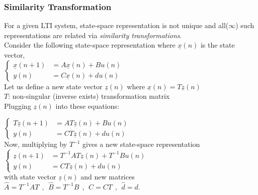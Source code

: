 \documentclass[mathserif, 10pt]{beamer} %
\def\x{\underline{x}}
\def\z{\underline{z}}
\begin{document}
\frame
{

\normalsize
\renewcommand{\theenumi}{\alph{enumi}}
\frametitle{Similarity Transformation}
For a given LTI system, state-space representation is not unique and all($\infty$) such representations are related via \textit{similarity transformations}. \\
Consider the following state-space representation where $\x(n)$ is the state vector, \\ \vspace{.05in}
 $\left\{
\begin{array}{rl}
	\x(n+1) &=A\x(n)+Bu(n)\\
	y(n)&=C\x(n)+du(n)
\end{array} \right.$
\\Let us define a new state vector $\z(n)$ where $\x(n) = T\z(n)$\\
$T$:  non-singular (inverse exists) transformation matrix\\
Plugging $\z(n)$ into these equations:\\ \vspace{.05in}

$\left\{
\begin{array}{rl}
	T\z(n+1) &= AT\z(n)+Bu(n)\\
	y(n)&=CT\z(n)+du(n)
\end{array} \right.$ \\
Now, multiplying by $T^{-1}$ gives a new state-space representation \\ \vspace{.05in}
$\left\{ \begin{array}{rl}
	\z(n+1)&=T^{-1}AT \z(n) + T^{-1}B u(n)\\
	y(n)& = CT \z(n)+du(n)
\end{array} \right.$ \\ \vspace{.06in}
with state vector $\z(n)$ and new matrices $\hat A = T^{-1}AT~~,~~\hat B = T^{-1}B~~,~~\hat C = CT~~,~~ \hat d=d$. \\



}
\frame
\end{document}
